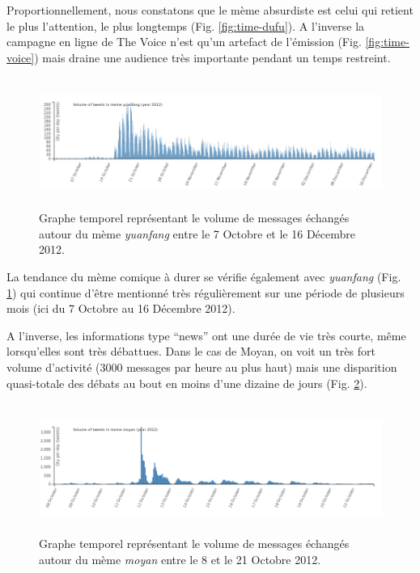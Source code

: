 Proportionnellement, nous constatons que le m\`eme absurdiste est celui qui retient le plus l{\textquoteright}attention, le plus longtemps (Fig. \ref{fig:time-dufu}). A l{\textquoteright}inverse la campagne en ligne de The Voice n{\textquoteright}est qu{\textquoteright}un artefact de l{\textquoteright}\'emission (Fig. \ref{fig:time-voice}) mais draine une audience tr\`es importante pendant un temps restreint. 

\begin{figure}[ht]
    \centering
    
  \includegraphics[width=6.0087in,height=1.6697in]{figures/chap4/chapitre4-img5.png}
  
  \caption{
   Graphe temporel repr\'esentant le volume de messages \'echang\'es  autour du m\`eme \textit{yuanfang} entre le 7 Octobre et le 16 D\'ecembre 2012.
  }
  \label{fig:time-yuanfang}
\end{figure}

La tendance du m\`eme comique \`a durer se v\'erifie \'egalement avec
\textit{yuanfang} (Fig. \ref{fig:time-yuanfang}) qui continue d{\textquoteright}\^etre mentionn\'e
tr\`es r\'eguli\`erement sur une p\'eriode de plusieurs mois (ici du 7
Octobre au 16 D\'ecembre 2012).

A l{\textquoteright}inverse, les informations type {\textquotedblleft}news{\textquotedblright} ont une dur\'ee de vie tr\`es courte, m\^eme lorsqu{\textquoteright}elles sont tr\`es d\'ebattues. Dans le cas de Moyan, on voit un tr\`es fort volume d{\textquoteright}activit\'e (3000 messages par heure au plus haut) mais une disparition quasi-totale des d\'ebats au bout en moins d{\textquoteright}une dizaine de jours (Fig. \ref{fig:time-moyan}).

\begin{figure}
    \centering
    \includegraphics[width=6.0087in,height=1.6697in]{figures/chap4/chapitre4-img6.png}
    \caption{
      Graphe temporel repr\'esentant le volume de messages \'echang\'es autour du m\`eme \textit{moyan} entre le 8 et le 21 Octobre 2012.
    }
    \label{fig:time-moyan}
\end{figure}

